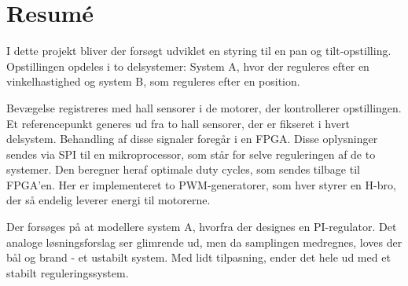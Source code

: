 \documentclass[rapport.tex]{subfiles}
\begin{document}
\chapter*{Resumé}

I dette projekt bliver der forsøgt udviklet en styring til en pan og tilt-opstilling. Opstillingen opdeles i to delsystemer: System A, hvor der reguleres efter en vinkelhastighed og system B, som reguleres efter en position.

Bevægelse registreres med hall sensorer i de motorer, der kontrollerer opstillingen. Et referencepunkt generes ud fra to hall sensorer, der er fikseret i hvert delsystem. Behandling af disse signaler foregår i en FPGA. Disse oplysninger sendes via SPI til en mikroprocessor, som står for selve reguleringen af de to systemer. Den beregner heraf optimale duty cycles, som sendes tilbage til FPGA'en. Her er implementeret to PWM-generatorer, som hver styrer en H-bro, der så endelig leverer energi til motorerne.

Der forsøges på at modellere system A, hvorfra der designes en PI-regulator. Det analoge løsningsforslag ser glimrende ud, men da samplingen medregnes, loves der bål og brand - et ustabilt system. Med lidt tilpasning, ender det hele ud med et stabilt reguleringssystem.
\end{document}
